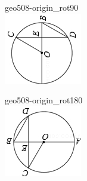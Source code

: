 \documentclass[12pt]{article}
\begin{document}
\begin{center}
\begin{minipage}{0.32\textwidth}
\end{minipage}
\hfill\begin{minipage}{0.32\textwidth}\centering
geo508-origin\_rot90\\
\includegraphics[width=0.95\linewidth]{out_rommath_origin/items/geo508-origin/assets/figure_rot90.png}
\end{minipage}
\par\medskip
\begin{minipage}{0.32\textwidth}\centering
geo508-origin\_rot180\\
\includegraphics[width=0.95\linewidth]{out_rommath_origin/items/geo508-origin/assets/figure_rot180.png}

\end{minipage}
\end{center}
\end{document}

